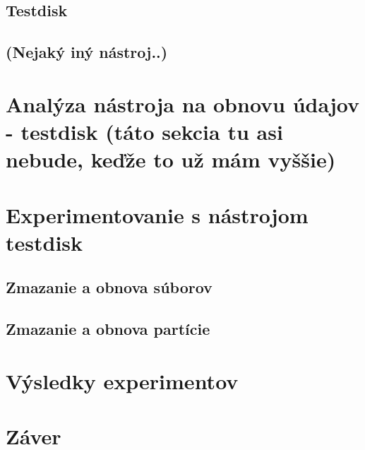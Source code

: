 \documentclass[12pt,oneside,slovak,a4paper]{article}
\begin{document}
\subsection{Testdisk}


\subsection{(Nejaký iný nástroj..)}


\section{Analýza nástroja na obnovu údajov - testdisk (táto sekcia tu asi nebude, keďže to už mám vyššie)}

\section{Experimentovanie s nástrojom testdisk}


\subsection{Zmazanie a obnova súborov}


\subsection{Zmazanie a obnova partície}


\section{Výsledky experimentov}


\section{Záver}




\end{document}
